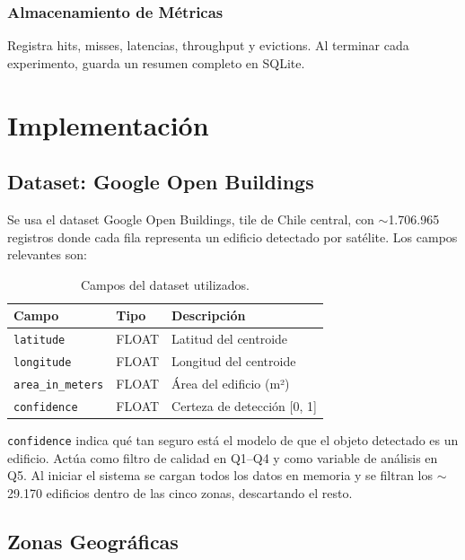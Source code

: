 \documentclass[letter,12pt]{article}
\begin{document}
\subsubsection{Almacenamiento de Métricas}
Registra hits, misses, latencias, throughput y evictions. Al terminar cada experimento,
guarda un resumen completo en SQLite.

\section{Implementación}

\subsection{Dataset: Google Open Buildings}

Se usa el dataset Google Open Buildings, tile de Chile central, con $\sim$1.706.965
registros donde cada fila representa un edificio detectado por satélite. Los campos
relevantes son:

\begin{table}[H]
\centering
\begin{tabular}{lll}
\toprule
\textbf{Campo} & \textbf{Tipo} & \textbf{Descripción} \\
\midrule
\texttt{latitude}         & FLOAT & Latitud del centroide \\
\texttt{longitude}        & FLOAT & Longitud del centroide \\
\texttt{area\_in\_meters} & FLOAT & Área del edificio (m²) \\
\texttt{confidence}       & FLOAT & Certeza de detección {[}0, 1{]} \\
\bottomrule
\end{tabular}
\caption{Campos del dataset utilizados.}
\end{table}

\texttt{confidence} indica qué tan seguro está el modelo de que el objeto detectado es
un edificio. Actúa como filtro de calidad en Q1--Q4 y como variable de análisis en Q5.
Al iniciar el sistema se cargan todos los datos en memoria y se filtran los $\sim$29.170
edificios dentro de las cinco zonas, descartando el resto.

\subsection{Zonas Geográficas}
\end{document}
